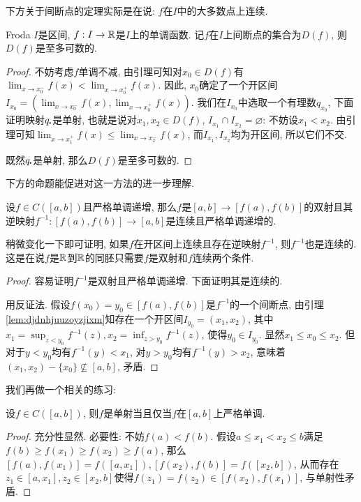 下方关于间断点的定理实际是在说: $f$在$I$中的大多数点上连续. 

\begin{theorem}{Froda}
	$I$是区间, $f:I \to \mathbb{R}$是$I$上的单调函数. 记$f$在$I$上间断点的集合为$D(f)$, 则$D(f)$是至多可数的. 
\end{theorem}
\begin{proof}
	不妨考虑$f$单调不减, 由引理可知对$x_0 \in D(f)$有$\lim_{x \to x_0^-} f(x) < \lim_{x \to x_0^+} f(x)$. 因此, $x_0$确定了一个开区间$I_{x_0}=(\lim_{x \to x_0^-} f(x) , \lim_{x \to x_0^+} f(x))$. 我们在$I_{x_0}$中选取一个有理数$q_{x_0}$, 下面证明映射$q_{\bigcdot}$是单射, 也就是说对$x_1,x_2 \in D(f)$, $I_{x_1} \cap I_{x_2} = \varnothing$: 不妨设$x_1<x_2$. 由引理可知$\lim_{x \to x_1^+} f(x) \leq \lim_{x \to x_2^-} f(x)$, 而$I_{x_1},I_{x_2}$均为开区间, 所以它们不交. 
	
	既然$q_{\bigcdot}$是单射, 那么$D(f)$是至多可数的. 
\end{proof}

下方的命题能促进对这一方法的进一步理解. 

\begin{proposition}{}
	设$f \in C([a,b])$且严格单调递增, 那么$f$是$[a,b] \to [f(a),f(b)]$的双射且其逆映射$f^{-1}:[f(a),f(b)] \to [a,b]$是连续且严格单调递增的. 
\end{proposition}
\begin{remark}
	稍微变化一下即可证明, 如果$f$在开区间上连续且存在逆映射$f^{-1}$, 则$f^{-1}$也是连续的. 这是在说$f$是$\mathbb{R}$到$\mathbb{R}$的同胚只需要$f$是双射和$f$连续两个条件. 
\end{remark}
\begin{proof}
	容易证明$f^{-1}$是双射且严格单调递增. 下面证明其是连续的. 
	
	用反证法. 假设$f(x_0)=y_0 \in [f(a),f(b)]$是$f^{-1}$的一个间断点, 由引理\ref{lem:djdnhjuuzoyzjixm}知存在一个开区间$I_{y_0}=(x_1,x_2)$, 其中$x_1=\sup_{z<y_0}f^{-1}(z),x_2=\inf_{z>y_0}f^{-1}(z)$, 使得$y_0 \in I_{y_0}$. 显然$x_1 \leq x_0 \leq x_2$. 但对于$y<y_0$均有$f^{-1}(y)<x_1$, 对$y>y_0$均有$f^{-1}(y)>x_2$, 意味着$(x_1,x_2)-\{ x_0 \} \nsubseteq [a,b]$, 矛盾. 
\end{proof}

我们再做一个相关的练习: 

\begin{proposition}{}
	设$f \in C([a,b])$, 则$f$是单射当且仅当$f$在$[a,b]$上严格单调. 
\end{proposition}
\begin{proof}
	充分性显然. 必要性: 不妨$f(a)<f(b)$. 假设$a \leq x_1 < x_2 \leq b$满足$f(b) \geq f(x_1) \geq f(x_2) \geq f(a)$, 那么$[f(a),f(x_1)] = f([a,x_1]), [f(x_2),f(b)] = f([x_2,b])$, 从而存在$z_1 \in [a,x_1],z_2 \in [x_2,b]$使得$f(z_1)=f(z_2) \in [f(x_2),f(x_1)]$, 与单射性矛盾. 
\end{proof}

